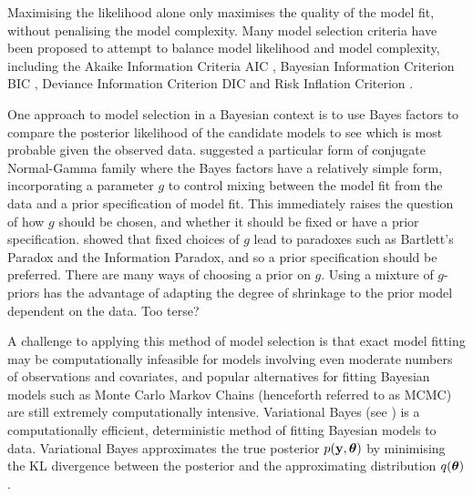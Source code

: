 \documentclass{amsart}[12pt]
\newcommand{\mgc}[1]{{\color{blue}#1}}
\begin{document}

Maximising the likelihood alone only maximises the quality of the model fit, without penalising the  model
complexity. Many model selection criteria have been proposed to attempt to balance model likelihood and model
complexity, including the Akaike Information Criteria AIC \cite{DeLeeuw1992}, Bayesian Information Criterion
BIC \cite{Schwarz1978}, Deviance Information Criterion DIC \cite{Spiegelhalter2016} and Risk Inflation
Criterion \cite{Foster1994}.


One approach to model selection in a Bayesian context is to use Bayes factors to compare the posterior
likelihood of the candidate models to see which is most probable given the observed data. \cite{Zellner1980}
suggested a particular form of conjugate Normal-Gamma family where the Bayes factors have a relatively simple
form, incorporating a parameter $g$ to control mixing between the model fit from the data and a prior
specification of model fit. This immediately raises the question of how $g$ should be chosen, and whether it
should be fixed or have a prior specification.  \cite{Liang2008} showed that fixed choices of $g$ lead to
paradoxes such as Bartlett's Paradox and the Information Paradox, and so a prior specification should be
preferred. There are many ways of choosing a prior on $g$. Using a mixture of $g$-priors has the advantage of
adapting the degree of shrinkage to the prior model dependent on the data. \mgc{Too terse?}



A challenge to applying this method of model selection is that exact model fitting may be computationally
infeasible for models involving even moderate numbers of observations and covariates, and popular alternatives
for fitting Bayesian models such as Monte Carlo Markov Chains (henceforth referred to as MCMC) are still
extremely computationally intensive. Variational Bayes (see \cite{Ormerod2010}) is a computationally
efficient, deterministic method of fitting Bayesian models to data. Variational Bayes approximates the true
posterior $p({\bf y}, {\boldsymbol \theta})$ by minimising the KL divergence between the posterior and the  approximating
distribution $q({\boldsymbol \theta})$.

\end{document}
